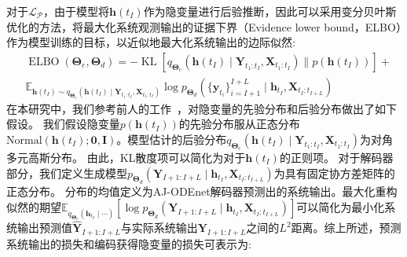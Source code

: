 对于$\mathcal{L_P}$，由于模型将$\boldsymbol h(t_I)$作为隐变量进行后验推断，因此可以采用变分贝叶斯优化的方法，将最大化系统观测输出的证据下界（Evidence lower bound，ELBO）作为模型训练的目标，以近似地最大化系统输出的边际似然\cite{10.5555/3454287.3454765}:
\begin{equation}
\begin{aligned}
&\operatorname{ELBO}(\boldsymbol{\Theta}_e,\boldsymbol{\Theta}_d)=-\operatorname{KL}\left[q_{\boldsymbol \Theta_e}(\boldsymbol h({t_I}) \mid\boldsymbol{Y}_{t_{1}: t_{I}}, \boldsymbol{X}_{t_{1}: t_{I}}) \| p\left(\boldsymbol h({t_I})\right)\right]+\\&\mathbb{E}_{\boldsymbol h({t_I}) \sim q_{\boldsymbol \Theta_e}(\boldsymbol h({t_I}) \mid\boldsymbol{Y}_{t_{1}: t_{I}}, \boldsymbol{X}_{t_{1}: t_{I}})}\log p_{\boldsymbol \Theta_d}(\{\boldsymbol y_{t_i}\}_{i=I+1}^{I+L}\mid \boldsymbol h_{t_I},\boldsymbol X_{t_I:t_{I+L}})
\end{aligned}
\end{equation}
在本研究中，我们参考前人的工作~\cite{chen2018neural, 10.5555/3454287.3454765, Yildiz2019}，对隐变量的先验分布和后验分布做出了如下假设。
我们假设隐变量$p(\boldsymbol{h}(t_I))$的先验分布服从正态分布$\text{Normal}(\boldsymbol{h}(t_I);\boldsymbol 0, \boldsymbol I)$。模型估计的后验分布$q_{\boldsymbol \Theta_e}(\boldsymbol h({t_I}) \mid\boldsymbol{Y}_{t_{1}: t_{I}}, \boldsymbol{X}_{t_{1}: t_{I}})$为对角多元高斯分布。
由此，KL散度项可以简化为对于$\boldsymbol h(t_I)$的正则项。
对于解码器部分，我们定义生成模型$p_{\boldsymbol \Theta_d}({\boldsymbol Y}_{I+1: I+L}\mid \boldsymbol h_{t_I},\boldsymbol X_{t_I:t_{I+L}})$为具有固定协方差矩阵的正态分布。
分布的均值定义为AJ-ODEnet解码器预测出的系统输出。最大化重构似然的期望$\mathbb{E}_{q_{\boldsymbol \Theta_e}(\boldsymbol h_{t_I} \mid\cdots)}\left[\log p_{\boldsymbol \Theta_d}({\boldsymbol Y}_{I+1: I+L}\mid \boldsymbol h_{t_I},\boldsymbol X_{t_I:t_{I+L}})\right]$可以简化为最小化系统输出预测值$\hat{\boldsymbol Y}_{I+1: I+L}$与实际系统输出${\boldsymbol Y}_{I+1: I+L}$之间的$L^2$距离。综上所述，预测系统输出的损失和编码获得隐变量的损失可表示为:

